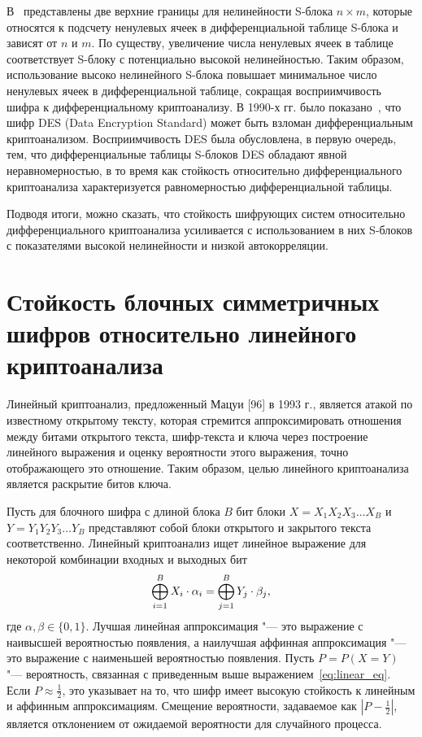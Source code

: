 В~\cite{Burnett} представлены две верхние границы для нелинейности S-блока $n
\times m$, которые относятся к подсчету ненулевых ячеек в дифференциальной
таблице S-блока и зависят от $n$ и $m$. По существу, увеличение числа ненулевых
ячеек в таблице соответствует S-блоку с потенциально высокой нелинейностью.
Таким образом, использование высоко нелинейного S-блока повышает минимальное
число ненулевых ячеек в дифференциальной таблице, сокращая восприимчивость шифра
к дифференциальному криптоанализу. В 1990-х гг. было показано~\cite{Biham}, что
шифр DES (Data Encryption Standard) может быть взломан дифференциальным
криптоанализом. Восприимчивость DES была обусловлена, в первую очередь, тем, что
дифференциальные таблицы S-блоков DES обладают явной неравномерностью, в то
время как стойкость относительно дифференциального криптоанализа характеризуется
равномерностью дифференциальной таблицы.

Подводя итоги, можно сказать, что стойкость шифрующих систем относительно
дифференциального криптоанализа усиливается с использованием в них S-блоков с
показателями высокой нелинейности и низкой автокорреляции.

\section{Стойкость блочных симметричных шифров относительно линейного криптоанализа}

Линейный криптоанализ, предложенный Мацуи [96] в 1993 г., является атакой по
известному открытому тексту, которая стремится аппроксимировать отношения между
битами открытого текста, шифр-текста и ключа через построение линейного
выражения и оценку вероятности этого выражения, точно отображающего это
отношение. Таким образом, целью линейного криптоанализа является раскрытие битов
ключа.

Пусть для блочного шифра с длиной блока $B$ бит блоки $X = X_1 X_2 X_3 \ldots
X_B$ и $Y = Y_1 Y_2 Y_3 \ldots Y_B$ представляют собой блоки открытого и
закрытого текста соответственно. Линейный криптоанализ ищет линейное выражение
для некоторой комбинации входных и выходных бит
\begin{equation}\label{eq:linear_eq}\bigoplus^{B}_{i=1} X_i \cdot \alpha_i =
\bigoplus^{B}_{j=1} Y_j \cdot \beta_j,\end{equation}
где $\alpha, \beta \in \{0,1\}$. Лучшая линейная аппроксимация "--- это
выражение с наивысшей вероятностью появления, а наилучшая аффинная аппроксимация
"--- это выражение с наименьшей вероятностью появления. Пусть $P = P(X = Y)$
"--- вероятность, связанная с приведенным выше выражением~\ref{eq:linear_eq}.
Если $P \approx \frac{1}{2}$, это указывает на то, что шифр имеет высокую
стойкость к линейным и аффинным аппроксимациям. Смещение вероятности, задаваемое
как $|P - \frac{1}{2}|$, является отклонением от ожидаемой вероятности для
случайного процесса.

